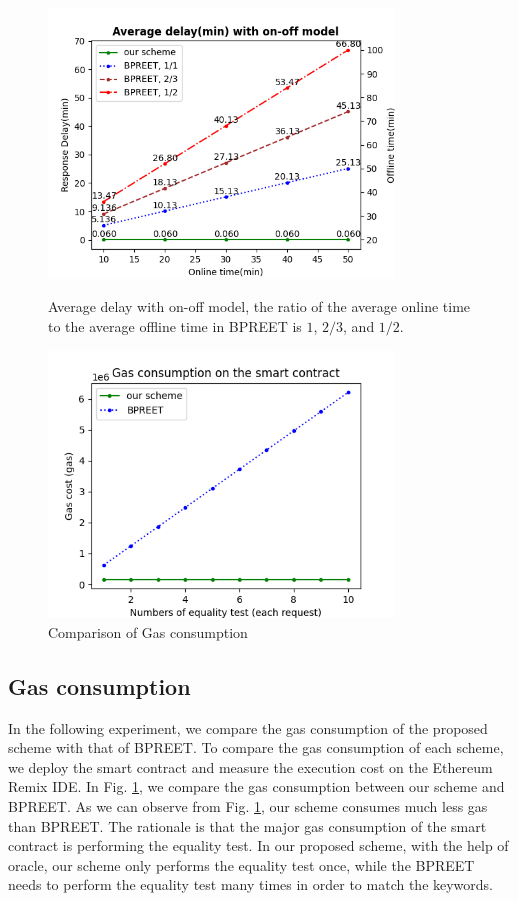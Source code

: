 \documentclass[journal]{IEEEtran}
\begin{document}
\begin{figure}[h]
    \centering
    \includegraphics[width=260pt]{picture/onoff_plot3.png}
    \caption{Average delay with on-off model, the ratio of the average online time to the average offline time in BPREET is $1$, $2/3$, and $1/2$.}
    \label{fig:delay_onoff}

    \centering
    \includegraphics[width=260pt]{picture/gas2.png}
    \caption{Comparison of Gas consumption}
    \label{fig:gas_cost}
\end{figure}

    \subsection{Gas consumption}
    
    In the following experiment, we compare the gas consumption of the proposed scheme with that of BPREET. To compare the gas consumption of each scheme, we deploy the smart contract and measure the execution cost on the Ethereum Remix IDE. In Fig. \ref{fig:gas_cost}, we compare the gas consumption between our scheme and BPREET. As we can observe from Fig. \ref{fig:gas_cost}, our scheme consumes much less gas than BPREET. The rationale is that the major gas consumption of the smart contract is performing the equality test. In our proposed scheme, with the help of oracle, our scheme only performs the equality test once, while the BPREET needs to perform the equality test many times in order to match the keywords. 
    
\end{document}
